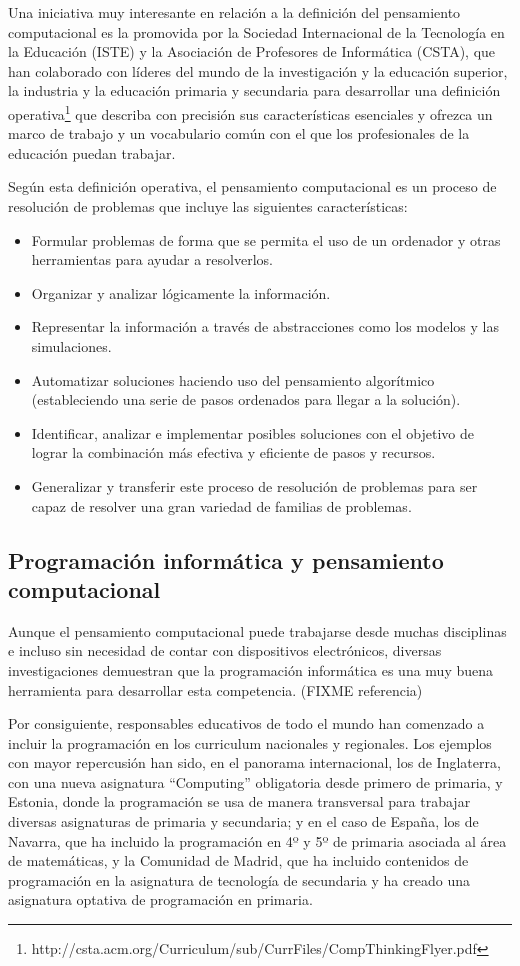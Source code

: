 \documentclass[a4paper,10pt]{article}
\begin{document}
Una iniciativa muy interesante en relación a la definición del pensamiento computacional es la promovida por la Sociedad Internacional de la Tecnología en la Educación (ISTE) y la Asociación de Profesores de Informática (CSTA), que han colaborado con líderes del mundo de la investigación y la educación superior, la industria y la educación primaria y secundaria para desarrollar una definición operativa\footnote{http://csta.acm.org/Curriculum/sub/CurrFiles/CompThinkingFlyer.pdf} que describa con precisión sus características esenciales y ofrezca un marco de trabajo y un vocabulario común con el que los profesionales de la educación puedan trabajar.

Según esta definición operativa, el pensamiento computacional es un proceso de resolución de problemas que incluye las siguientes características:

\begin{itemize}
 \item Formular problemas de forma que se permita el uso de un ordenador y otras herramientas para ayudar a resolverlos.
 \item Organizar y analizar lógicamente la información.
 \item Representar la información a través de abstracciones como los modelos y las simulaciones.
 \item Automatizar soluciones haciendo uso del pensamiento algorítmico (estableciendo una serie de pasos ordenados para llegar a la solución).
 \item Identificar, analizar e implementar posibles soluciones con el objetivo de lograr la combinación más efectiva y eficiente de pasos y recursos.
 \item Generalizar y transferir este proceso de resolución de problemas para ser capaz de resolver una gran variedad de familias de problemas.
\end{itemize}

\subsection*{Programación informática y pensamiento computacional}
Aunque el pensamiento computacional puede trabajarse desde muchas disciplinas e incluso sin necesidad de contar con dispositivos electrónicos, diversas investigaciones demuestran que la programación informática es una muy buena herramienta para desarrollar esta competencia. (FIXME referencia)

Por consiguiente, responsables educativos de todo el mundo han comenzado a incluir la programación en los curriculum nacionales y regionales. Los ejemplos con mayor repercusión han sido, en el panorama internacional, los de Inglaterra, con una nueva asignatura ``Computing'' obligatoria desde primero de primaria, y Estonia, donde la programación se usa de manera transversal para trabajar diversas asignaturas de primaria y secundaria; y en el caso de España, los de Navarra, que ha incluido la programación en 4º y 5º de primaria asociada al área de matemáticas, y la Comunidad de Madrid, que ha incluido contenidos de programación en la asignatura de tecnología de secundaria y ha creado una asignatura optativa de programación en primaria.
\end{document}
